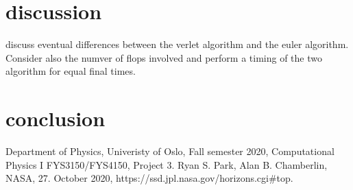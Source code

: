 \documentclass[reprint, english,notitlepage,nofootinbib]{revtex4-1}  %
\begin{document}
\section{discussion}

discuss eventual differences between the verlet algorithm and the euler algorithm. Consider also the numver of flops involved and perform a timing of the two algorithm for equal final times.

\section{conclusion}




\onecolumngrid
\vspace{1cm} %
\newpage

\begin{thebibliography}{}
 Department of Physics, Univeristy of Oslo, Fall semester 2020, Computational Physics I FYS3150/FYS4150, Project 3.
 Ryan S. Park, Alan B. Chamberlin, NASA, 27. October 2020, https://ssd.jpl.nasa.gov/horizons.cgi\#top.

\end{thebibliography}
\end{document}
